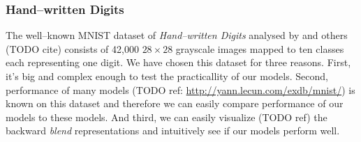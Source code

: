 \subsubsection{Hand--written Digits} 
\label{sec:datasets-digits} 

The well--known MNIST dataset of \emph{Hand--written Digits} analysed by \citet{lecun1998gradient} and others (TODO cite) consists of 42,000 $28 \times 28$ grayscale images mapped to ten classes each representing one digit. We have chosen this dataset for three reasons. First, it's big and complex enough to test the practicallity of our models. Second, performance of many models (TODO ref: \url{http://yann.lecun.com/exdb/mnist/}) is known on this dataset and therefore we can easily compare performance of our models to these models. And third, we can easily visualize (TODO ref) the backward \emph{blend} representations and intuitively see if our models perform well. 

